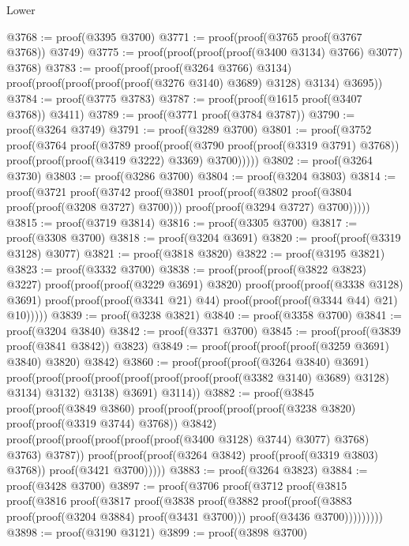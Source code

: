 \begin{lexlean}{Lower}
\begin{coremodule}
@3768 := proof(@3395 @3700)
@3771 := proof(proof(@3765 proof(@3767 @3768)) @3749)
@3775 := proof(proof(proof(proof(@3400 @3134) @3766) @3077) @3768)
@3783 := proof(proof(proof(@3264 @3766) @3134)
      proof(proof(proof(proof(proof(@3276 @3140) @3689) @3128) @3134) @3695))
@3784 := proof(@3775 @3783)
@3787 := proof(proof(@1615 proof(@3407 @3768)) @3411)
@3789 := proof(@3771 proof(@3784 @3787))
@3790 := proof(@3264 @3749)
@3791 := proof(@3289 @3700)
@3801 := proof(@3752
      proof(@3764
          proof(@3789
              proof(proof(@3790 proof(proof(@3319 @3791) @3768))
                  proof(proof(proof(@3419 @3222) @3369) @3700)))))
@3802 := proof(@3264 @3730)
@3803 := proof(@3286 @3700)
@3804 := proof(@3204 @3803)
@3814 := proof(@3721
      proof(@3742
          proof(@3801
              proof(proof(@3802 proof(@3804 proof(proof(@3208 @3727) @3700)))
                  proof(proof(@3294 @3727) @3700)))))
@3815 := proof(@3719 @3814)
@3816 := proof(@3305 @3700)
@3817 := proof(@3308 @3700)
@3818 := proof(@3204 @3691)
@3820 := proof(proof(@3319 @3128) @3077)
@3821 := proof(@3818 @3820)
@3822 := proof(@3195 @3821)
@3823 := proof(@3332 @3700)
@3838 := proof(proof(proof(@3822 @3823) @3227)
      proof(proof(proof(@3229 @3691) @3820)
          proof(proof(proof(@3338 @3128) @3691)
              proof(proof(proof(@3341 @21) @44) proof(proof(proof(@3344 @44) @21) @10)))))
@3839 := proof(@3238 @3821)
@3840 := proof(@3358 @3700)
@3841 := proof(@3204 @3840)
@3842 := proof(@3371 @3700)
@3845 := proof(proof(@3839 proof(@3841 @3842)) @3823)
@3849 := proof(proof(proof(proof(@3259 @3691) @3840) @3820) @3842)
@3860 := proof(proof(proof(@3264 @3840) @3691)
      proof(proof(proof(proof(proof(proof(proof(proof(@3382 @3140) @3689) @3128) @3134) @3132)
              @3138)
            @3691)
          @3114))
@3882 := proof(@3845
      proof(proof(@3849 @3860)
          proof(proof(proof(proof(proof(@3238 @3820) proof(proof(@3319 @3744) @3768)) @3842)
                proof(proof(proof(proof(proof(proof(@3400 @3128) @3744) @3077) @3768) @3763) @3787))
              proof(proof(proof(@3264 @3842) proof(proof(@3319 @3803) @3768)) proof(@3421 @3700)))))
@3883 := proof(@3264 @3823)
@3884 := proof(@3428 @3700)
@3897 := proof(@3706
      proof(@3712
          proof(@3815
              proof(@3816
                  proof(@3817
                      proof(@3838
                          proof(@3882
                              proof(proof(@3883 proof(proof(@3204 @3884) proof(@3431 @3700)))
                                  proof(@3436 @3700)))))))))
@3898 := proof(@3190 @3121)
@3899 := proof(@3898 @3700)

\end{coremodule}
\end{lexlean}
